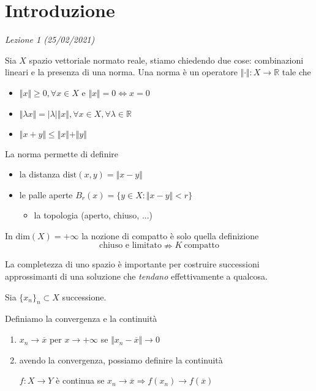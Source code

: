 \documentclass[10pt,a4paper,twoside,openright]{book}
\begin{document}
\chapter{Introduzione}
\textit{Lezione 1 (25/02/2021)}

Sia $X$ spazio vettoriale normato reale, stiamo chiedendo due cose: combinazioni lineari e la presenza di una norma. Una norma è un operatore $\Vert \cdotp \Vert :X\rightarrow \mathbb{R}$ tale che
\begin{itemize}
\item $\Vert x\Vert \geqslant 0,\forall x\in X$ e $\Vert x\Vert =0\Leftrightarrow x=0$
\item $\Vert \lambda x\Vert =| \lambda | \Vert x\Vert,\forall x\in X,\forall \lambda \in \mathbb{R}$
\item $\Vert x+y\Vert \leqslant \Vert x\Vert +\Vert y\Vert $
\end{itemize}

La norma permette di definire
\begin{itemize}
\item la distanza $\text{dist}(x,y) =\Vert x-y\Vert $
\item le palle aperte $B_{r}(x) =\{y\in X:\Vert x-y\Vert < r\}$
\begin{itemize}
\item la topologia (aperto, chiuso, ...)
\end{itemize}
\end{itemize}
\begin{nb}
In $\mathrm{dim}(X) =+\infty $ la nozione di compatto è solo quella definizione
\begin{equation*}
\text{chiuso e limitato} \nRightarrow K\ \text{compatto}
\end{equation*}
\end{nb}
La completezza di uno spazio è importante per costruire successioni approssimanti di una soluzione che \textit{tendano} effettivamente a qualcosa.



Sia $\{x_{n}\}_{n} \subset X$ successione.
\begin{definition}
Definiamo la convergenza e la continuità
\begin{enumerate}
\item $x_{n}\rightarrow \overline{x}$ per $x\rightarrow +\infty $ se $\Vert x_{n} -\overline{x}\Vert \rightarrow 0$
\item avendo la convergenza, possiamo definire la continuità

$f:X\rightarrow Y$ è continua se $x_{n}\rightarrow \overline{x} \Rightarrow f(x_{n})\rightarrow f(\overline{x})$
\end{enumerate}
\end{definition}
\end{document}
